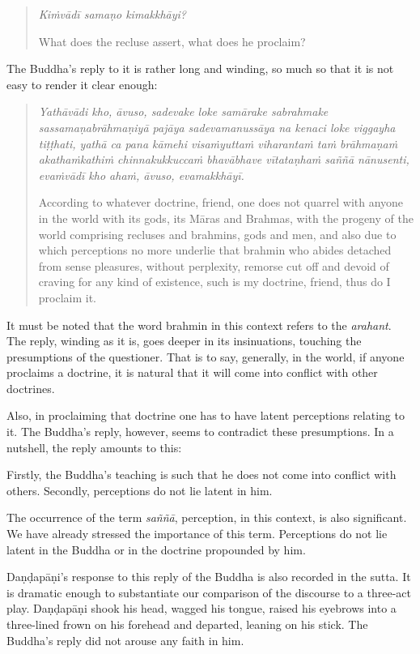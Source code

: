 \clearpage

\begin{quote}
\emph{Kiṁvādī samaṇo kimakkhāyi?}

What does the recluse assert, what does he proclaim?
\end{quote}

The Buddha's reply to it is rather long and winding, so much so that it is not easy to render it clear enough:

\begin{quote}
\emph{Yathāvādi kho, āvuso, sadevake loke samārake sabrahmake sassamaṇabrāhmaṇiyā pajāya sadevamanussāya na kenaci loke viggayha tiṭṭhati, yathā ca pana kāmehi visaṁyuttaṁ viharantaṁ taṁ brāhmaṇaṁ akathaṁkathiṁ chinnakukkuccaṁ bhavābhave vītataṇhaṁ saññā nānusenti, evaṁvādī kho ahaṁ, āvuso, evamakkhāyī.}

According to whatever doctrine, friend, one does not quarrel with anyone in the world with its gods, its Māras and Brahmas, with the progeny of the world comprising recluses and brahmins, gods and men, and also due to which perceptions no more underlie that brahmin who abides detached from sense pleasures, without perplexity, remorse cut off and devoid of craving for any kind of existence, such is my doctrine, friend, thus do I proclaim it.
\end{quote}

It must be noted that the word brahmin in this context refers to the \emph{arahant}. The reply, winding as it is, goes deeper in its insinuations, touching the presumptions of the questioner. That is to say, generally, in the world, if anyone proclaims a doctrine, it is natural that it will come into conflict with other doctrines.

Also, in proclaiming that doctrine one has to have latent perceptions relating to it. The Buddha's reply, however, seems to contradict these presumptions. In a nutshell, the reply amounts to this:

Firstly, the Buddha's teaching is such that he does not come into conflict with others. Secondly, perceptions do not lie latent in him.

The occurrence of the term \emph{saññā}, perception, in this context, is also significant. We have already stressed the importance of this term. Perceptions do not lie latent in the Buddha or in the doctrine propounded by him.

Daṇḍapāṇi's response to this reply of the Buddha is also recorded in the sutta. It is dramatic enough to substantiate our comparison of the discourse to a three-act play. Daṇḍapāṇi shook his head, wagged his tongue, raised his eyebrows into a three-lined frown on his forehead and departed, leaning on his stick. The Buddha's reply did not arouse any faith in him.

